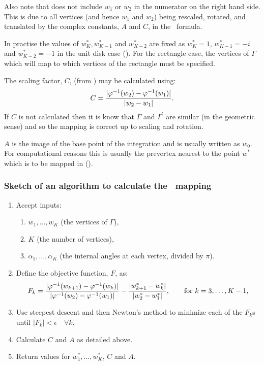 Also note that  does not include $w_1$ or $w_2$ in the numerator on the right hand side. This is due to all vertices (and hence $w_1$ and $w_2$) being rescaled, rotated, and translated by the complex constants, $A$ and $C$, in the \sch\ formula.

In practise the values of $w^*_K, w^*_{K-1}$ and $w^*_{K-2}$ are fixed as $w^*_K=1$, $w^*_{K-1}=-i$ and $w^*_{K-2}=-1$ in the unit disk case (\cite[p. 24]{driscoll}). For the rectangle case, the vertices of $\Gamma$ which will map to which vertices of the rectangle must be specified.

The scaling factor, $C$, (from ) may be calculated using:
\begin{equation}
C=\frac{\vert \varphi^{-1}(w_2)-\varphi^{-1}(w_1)\vert}{\vert w_2 - w_1\vert}.
\end{equation}
If $C$ is not calculated then it is know that $\Gamma$ and $\Gamma^\prime$ are similar (in the geometric sense) and so the mapping is correct up to scaling and rotation. 

$A$ is the image of the base point of the integration and is usually written as $w_0$. For computational reasons this is usually the prevertex nearest to the point $w^*$ which is to be mapped in   (\cite[p. 27]{driscoll}).


\subsubsection{Sketch of an algorithm to calculate the \sch\ mapping}
\label{algorithmsketch}
\begin{enumerate}
\item Accept inputs:
   \begin{enumerate} 
      \item $w_1,\dots,w_K$ (the vertices of $\Gamma$),
      \item $K$ (the number of vertices),
      \item $\alpha_1,\dots,\alpha_K$ (the internal angles at each vertex, divided by $\pi$).
   \end{enumerate}
\item Define the objective function, $F$, as:
 \begin{equation*}
F_k=\frac{\vert \varphi^{-1}(w_{k+1}) -  \varphi^{-1}(w_k) \vert}{\vert \varphi^{-1}(w_2)-\varphi^{-1}(w_1)\vert} - \frac{\vert w^*_{k+1} - w^*_k\vert}{\vert w^*_2 - w^*_1\vert}, \qquad \text{for } k=3,\dots,K-1,
 \end{equation*}
\item Use steepest descent and then Newton's method to minimize each of the $F_k$s until $\vert F_k \vert < \epsilon \quad \forall k$. \item Calculate $C$ and $A$ as detailed above.
\item Return values for $w^*_1,\dots,w^*_K$, $C$ and $A$.
\end{enumerate}

